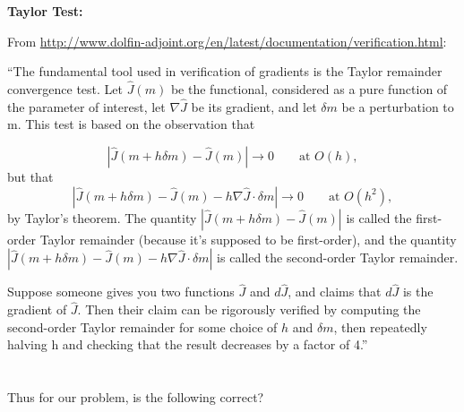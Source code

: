 \documentclass{article}
\begin{document}
\noindent \textbf{Taylor Test:}

From \url{http://www.dolfin-adjoint.org/en/latest/documentation/verification.html}:

``The fundamental tool used in verification of gradients is the Taylor remainder convergence test. Let $\hat{J}(m)$ be the functional, considered as a pure function of the parameter of interest, let $\nabla \hat{J}$ be its gradient, and let $\delta m$ be a perturbation to m. This test is based on the observation that

\begin{equation}
    |\hat{J}(m + h \delta m) - \hat{J}(m) | \rightarrow 0 \qquad \text{at } O(h),
\end{equation}
but that
\begin{equation}
    |\hat{J}(m + h \delta m) - \hat{J}(m) - h \nabla \hat{J} \cdot \delta m| \rightarrow 0 \qquad \text{at } O(h^2),
\end{equation}
by Taylor’s theorem. The quantity $|\hat{J}(m + h \delta m) - \hat{J}(m) |$ is called the first-order Taylor remainder (because it’s supposed to be first-order), and the quantity $|\hat{J}(m + h \delta m) - \hat{J}(m) - h \nabla \hat{J} \cdot \delta m|$ is called the second-order Taylor remainder.

Suppose someone gives you two functions $\hat{J}$ and $d\hat{J}$, and claims that $d\hat{J}$ is the gradient of $\hat{J}$. Then their claim can be rigorously verified by computing the second-order Taylor remainder for some choice of $h$ and $\delta m$, then repeatedly halving h and checking that the result decreases by a factor of 4.''
\\\\\\
Thus for our problem, is the following correct?
\end{document}
